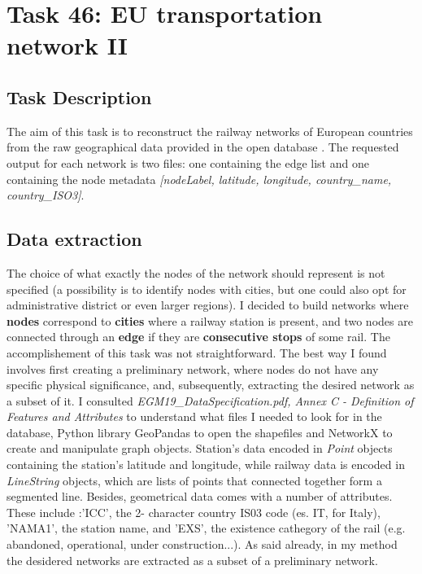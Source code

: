 \chapter{Task 46: EU transportation network II}
\section{Task Description}
The aim of this task is to reconstruct the railway networks of European countries from the raw geographical data provided in the open database
\parencite[][ \textit{EuroGlobalMap}, $2019$ release]{euroglobalmap}. The requested output for each network is two files: one containing the edge list and one containing the node metadata \textit{[nodeLabel, latitude, longitude, country\_name, country\_ISO3]}.
\section{Data extraction}
The choice of what exactly the nodes of the network should represent is not specified (a possibility is to identify nodes with cities, but one could also opt for administrative district or even larger regions).
I decided to build networks where \textbf{nodes} correspond to \textbf{cities} where a railway station is present, and two nodes are connected through an \textbf{edge}  if they are \textbf{consecutive stops} of some rail. The accomplishement of this task was not straightforward. The best way I found involves first creating a preliminary network, where nodes do not have any specific physical significance, and, subsequently, extracting the desired network as a subset of it. \newline \noindent
I consulted \textit{EGM19\_DataSpecification.pdf, 
 Annex C - Definition of Features and Attributes} to understand what files I needed to look for in the database, Python library GeoPandas to open the shapefiles and NetworkX to create and manipulate graph objects. Station's data encoded in \textit{Point} objects containing the station's latitude and longitude, while railway data is encoded in \textit{LineString} objects, which are lists of points that connected together form a segmented line.
Besides, geometrical data comes with a number of attributes. These include :'ICC', the 2- character country IS03 code (es. IT, for Italy),  'NAMA1', the station name, and 'EXS', the existence cathegory of the rail (e.g. abandoned, operational, under construction...).
\medskip \newline \noindent
As said already, in my method the desidered networks are extracted as a subset of a preliminary network. 
